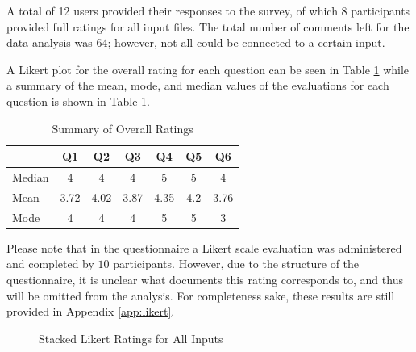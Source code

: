 \documentclass[sigconf,nonacm]{acmart}
\begin{document}
A total of 12 users provided their responses to the survey, of which 8 participants provided full ratings for all input files. The total number of comments left for the data analysis was 64; however, not all could be connected to a certain input.

A Likert plot for the overall rating for each question can be seen in Table \ref{fig:likert_overall} while a summary of the mean, mode, and median values of the evaluations for each question is shown in Table \ref{tab:values_overall}.


\begin{table}[h]
    \centering
    \begin{tabular}{lcccccc}
        \toprule
        & Q1 & Q2 & Q3 & Q4 & Q5 & Q6 \\
        \midrule
        Median & 4 & 4 & 4 & 5 & 5 & 4 \\
        Mean & 3.72 & 4.02 & 3.87 & 4.35 & 4.2 & 3.76 \\
        Mode & 4 & 4 & 4 & 5 & 5 & 3 \\
        \bottomrule
    \end{tabular}
    \caption{Summary of Overall Ratings}
    \label{tab:values_overall}
\end{table}

Please note that in the questionnaire a Likert scale evaluation was administered and completed by $10$ participants. However, due to the structure of the questionnaire, it is unclear what documents this rating corresponds to, and thus will be omitted from the analysis. For completeness sake, these results are still provided in Appendix \ref{app:likert}.



\begin{figure}[h]
    \centering
    \caption{Stacked Likert Ratings for All Inputs}
    \label{fig:likert_overall}
\end{figure}
\end{document}
